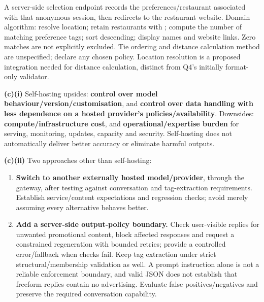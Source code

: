 \begin{studycolumns}
\vspace{0pt}





A server-side selection endpoint records the preferences/\allowbreak{}restaurant associated with that anonymous session, then redirects to the restaurant website. Domain algorithm: resolve location; retain restaurants with ; compute the number of matching preference tags; sort descending; display names and website links. Zero matches are not explicitly excluded. Tie ordering and distance calculation method are unspecified; declare any chosen policy. Location resolution is a proposed integration needed for distance calculation, distinct from Q4's initially format-only validator.

\textbf{(c)(i)} Self-hosting upsides: \textbf{control over model behaviour/\allowbreak{}version/\allowbreak{}customisation}, and \textbf{control over data handling with less dependence on a hosted provider's policies/\allowbreak{}availability}. Downsides: \textbf{compute/\allowbreak{}infrastructure cost}, and \textbf{operational/\allowbreak{}expertise burden} for serving, monitoring, updates, capacity and security. Self-hosting does not automatically deliver better accuracy or eliminate harmful outputs.

\textbf{(c)(ii)} Two approaches other than self-hosting:

\begin{enumerate}
\item \textbf{Switch to another externally hosted model/\allowbreak{}provider}, through the gateway, after testing against conversation and tag-extraction requirements. Establish service/\allowbreak{}content expectations and regression checks; avoid merely assuming every alternative behaves better.
\item \textbf{Add a server-side output-policy boundary.} Check user-visible replies for unwanted promotional content, block affected responses and request a constrained regeneration with bounded retries; provide a controlled error/\allowbreak{}fallback when checks fail. Keep tag extraction under strict structural/\allowbreak{}membership validation as well. A prompt instruction alone is not a reliable enforcement boundary, and valid JSON does not establish that freeform replies contain no advertising. Evaluate false positives/\allowbreak{}negatives and preserve the required conversation capability.
\end{enumerate}

\end{studycolumns}
